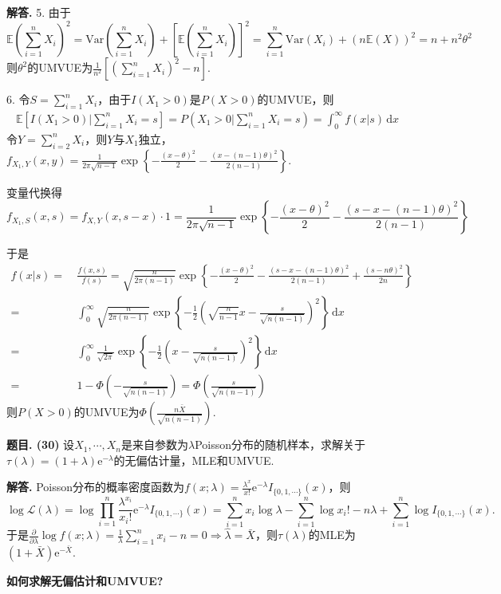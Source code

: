 \documentclass[12pt, a4paper, oneside]{ctexart}
\newcounter{problem}  %
\newenvironment{problem}[1][]{\stepcounter{problem}\par\noindent\textbf{题目\arabic{problem}. #1}}{\smallskip\par}
\newenvironment{solution}[1][]{\par\noindent\textbf{#1解答. }}{\smallskip\par}  %
\def\E{\mathbb{E}}          %
\def\var{\text{Var}}        %
\def\d{\mathrm{d}}          %
\def\e{\mathrm{e}}          %
\def\L{\mathcal{L}}         %
\def\add{\vspace{1ex}}      %
\begin{document}
\begin{solution}
    5. 由于
    \begin{equation*}
        \E\left(\sum_{i=1}^nX_i\right)^2 = \var\left(\sum_{i=1}^nX_i\right)+\left[\E\left(\sum_{i=1}^nX_i\right)\right]^2 = \sum_{i=1}^n\var(X_i)+(n\E(X))^2 = n+n^2\theta^2
    \end{equation*}
   则$\theta^2$的UMVUE为$\frac{1}{n^2}\left[\left(\sum_{i=1}^nX_i\right)^2-n\right]$.\add

    6. 令$S  = \sum_{i=1}^nX_i$，由于$I(X_1>0)$是$P(X>0)$的UMVUE，则
    \begin{align*}
        \E\left[I(X_1>0)\biggl|\sum_{i=1}^nX_i=s\right] = P(X_1>0|\sum_{i=1}^nX_i=s) = \int_0^\infty f(x|s)\,\d x
    \end{align*}
    令$Y = \sum_{i=2}^nX_i$，则$Y$与$X_1$独立，$f_{X_1,Y}(x,y) = \frac{1}{2\pi\sqrt{n-1}}\exp\left\{-\frac{(x-\theta)^2}{2}-\frac{(x-(n-1)\theta)^2}{2(n-1)}\right\}$.\add

    变量代换得
    \begin{equation*}
        f_{X_1,S}(x,s) = f_{X,Y}(x,s-x)\cdot 1 = \frac{1}{2\pi\sqrt{n-1}}\exp\left\{-\frac{(x-\theta)^2}{2}-\frac{(s-x-(n-1)\theta)^2}{2(n-1)}\right\}
    \end{equation*}

    于是
    \begin{align*}
        f(x|s) =&\ \frac{f(x,s)}{f(s)} = \sqrt{\frac{n}{2\pi(n-1)}}\exp\left\{-\frac{(x-\theta)^2}{2}-\frac{(s-x-(n-1)\theta)^2}{2(n-1)}+\frac{(s-n\theta)^2}{2n}\right\}\\
        =&\ \int_0^\infty\sqrt{\frac{n}{2\pi(n-1)}}\exp\left\{-\frac{1}{2}\left(\sqrt{\frac{n}{n-1}}x-\frac{s}{\sqrt{n(n-1)}}\right)^2\right\}\,\d x\\
        =&\ \int_0^\infty\frac{1}{\sqrt{2\pi}}\exp\left\{-\frac{1}{2}\left(x-\frac{s}{\sqrt{n(n-1)}}\right)^2\right\}\,\d x\\
        =&\ 1-\Phi(-\frac{s}{\sqrt{n(n-1)}}) = \Phi(\frac{s}{\sqrt{n(n-1)}})
    \end{align*}
    则$P(X>0)$的UMVUE为$\Phi(\frac{n\bar{X}}{\sqrt{n(n-1)}})$.
\end{solution}
\begin{problem}[(30)]
    设$X_1,\cdots,X_n$是来自参数为$\lambda$Poisson分布的随机样本，求解关于$\tau(\lambda) = (1+\lambda)\e^{-\lambda}$的无偏估计量，MLE和UMVUE.
\end{problem}
\begin{solution}
    Poisson分布的概率密度函数为$f(x;\lambda) = \frac{\lambda^x}{x!}\e^{-\lambda}I_{\{0,1,\cdots\}}(x)$，则
    \begin{equation*}
        \log\L(\lambda) = \log\prod_{i=1}^n\frac{\lambda^{x_i}}{x_i!}\e^{-\lambda}I_{\{0,1,\cdots\}}(x) = \sum_{i=1}^nx_i\log\lambda - \sum_{i=1}^n\log x_i!-n\lambda + \sum_{i=1}^n\log I_{\{0,1,\cdots\}}(x).
    \end{equation*}
    于是$\frac{\partial}{\partial\lambda}\log f(x;\lambda) = \frac{1}{\lambda}\sum_{i=1}^nx_i-n = 0\Rightarrow \hat{\lambda} = \bar{X}$，则$\tau(\lambda)$的MLE为$(1+\bar{X})\e^{-\bar{X}}$.

    \textbf{如何求解无偏估计和UMVUE?}
\end{solution}
\end{document}

